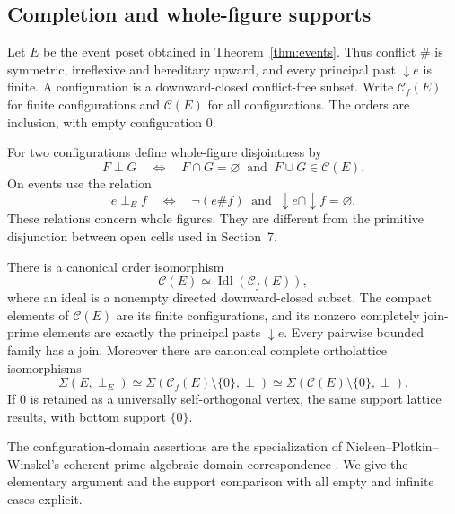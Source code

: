 \subsection{Completion and whole-figure supports}
Let $E$ be the event poset obtained in Theorem~\ref{thm:events}.
Thus conflict $\#$ is symmetric, irreflexive and hereditary upward,
and every principal past $\downarrow e$ is finite. A configuration
is a downward-closed conflict-free subset. Write $\mathcal C_f(E)$
for finite configurations and $\mathcal C(E)$ for all configurations.
The orders are inclusion, with empty configuration $0$.

For two configurations define whole-figure disjointness by
\[
 F\perp G\quad\Longleftrightarrow\quad
 F\cap G=\varnothing\ \text{ and }\ F\cup G\in\mathcal C(E).
\]
On events use the relation
\[
 e\perp_E f\quad\Longleftrightarrow\quad
 \neg(e\# f)\ \text{ and }\
 \downarrow e\cap\downarrow f=\varnothing.
\]
These relations concern whole figures. They are different from the
primitive disjunction between open cells used in Section~7.

\begin{proposition}
\label{prop:event-domain}
There is a canonical order isomorphism
\[
 \mathcal C(E)\simeq\operatorname{Idl}(\mathcal C_f(E)),
\]
where an ideal is a nonempty directed downward-closed subset.
The compact elements of $\mathcal C(E)$ are its finite configurations,
and its nonzero completely join-prime elements are exactly the
principal pasts $\downarrow e$. Every pairwise bounded family has
a join. Moreover there are canonical complete ortholattice
isomorphisms
\[
 \Sigma(E,\perp_E)\simeq
 \Sigma(\mathcal C_f(E)\setminus\{0\},\perp)
 \simeq\Sigma(\mathcal C(E)\setminus\{0\},\perp).
\]
If $0$ is retained as a universally self-orthogonal vertex,
the same support lattice results, with bottom support $\{0\}$.
\end{proposition}
The configuration-domain assertions are the specialization of
Nielsen--Plotkin--Winskel's coherent prime-algebraic domain
correspondence \cite[Definitions~17--18 and Theorems~8--9, p.~102]{NPW}.
We give the elementary argument and the support comparison with
all empty and infinite cases explicit.

